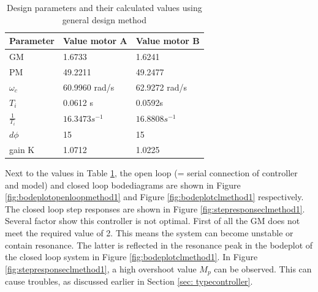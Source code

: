\documentclass[a4paper,kul]{kulakarticle} %
\begin{document}
\begin{table}[htp!]
	
	\centering
	
	\begin{tabular}{|l|l|l|}
		\hline
		Parameter                & Value motor A & Value motor B                       \\ \hline
		GM                       & 1.6733 &        1.6241                \\
		PM                       & 49.2211\degree & 49.2477\degree \\
		$\omega_c$ & 60.9960 rad/s              &  62.9272 rad/s\\
		$T_i $                    & 0.0612 s    &     0.0592s           \\
		$\frac{1}{T_i}$                    & $16.3473 s^{-1}$  &  $16.8808s^{-1}$                  \\
		$d\phi$             & 15\degree    & 15\degree \\
		gain K 	 		& 1.0712  & 1.0225 \\  \hline
	\end{tabular}
	\caption{Design parameters and their calculated values using general design method}
	\label{tab:values}
\end{table}
Next to the values in Table \ref{tab:values}, the open loop (= serial connection of controller and model) and closed loop bodediagrams are shown in Figure \ref{fig:bodeplotopenloopmethod1} and Figure \ref{fig:bodeplotclmethod1} respectively. The closed loop step responses are shown in Figure \ref{fig:stepresponseclmethod1}. Several factor show this controller is not optimal. First of all the GM does not meet the required value of 2. This means the system can become unstable or contain resonance. The latter is reflected in the resonance peak in the bodeplot of the closed loop system in Figure \ref{fig:bodeplotclmethod1}. In Figure \ref{fig:stepresponseclmethod1}, a high overshoot value $M_p$ can be observed. This can cause troubles, as discussed earlier in Section \ref{sec: typecontroller}. 
\end{document}
